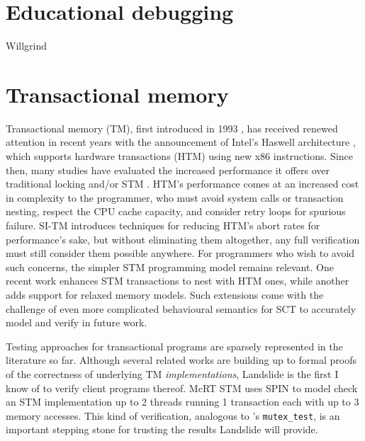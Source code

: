 \section{Educational debugging}

Willgrind \cite{willgrind}

\section{Transactional memory}

Transactional memory (TM), first introduced in 1993 \cite{transactional-memory},
has received renewed attention in recent years with the announcement of Intel's Haswell architecture \cite{htm-haswell},
which supports hardware transactions (HTM) using new x86 instructions.
Since then, many studies have evaluated the increased performance it offers over traditional locking and/or STM
\cite{tm-benchmark-cmu}. %
%
HTM's performance comes at an increased cost in complexity to the programmer,
who must avoid system calls or transaction nesting, respect the CPU cache capacity,
and consider retry loops for spurious failure.
SI-TM \cite{si-tm} introduces techniques for reducing HTM's abort rates for performance's sake,
but without eliminating them altogether, any full verification must still consider them possible anywhere.
For programmers who wish to avoid such concerns,
the simpler STM programming model remains relevant.
One recent work \cite{hybrid-htm-stm} enhances STM transactions to nest with HTM ones,
while another \cite{stm-relaxed-memory} adds support for relaxed memory models.
Such extensions come with the challenge of even more complicated behavioural semantics
for SCT to accurately model and verify in future work.

Testing approaches for transactional programs are sparsely represented in the literature so far.
Although several related works \cite{tm-correctness,tm-completeness,specifying-verifying-tm}
are building up to formal proofs of the correctness of underlying TM {\em implementations},
Landslide is the first I know of to verify client programs thereof.
McRT STM \cite{mc-tm-with-spin} uses SPIN \cite{spin} to model check an STM implementation
up to 2 threads running 1 transaction each with up to 3 memory accesses.
This kind of verification,
analogous to \sect{\ref{sec:education-pebbles-tests}}'s {\tt mutex\_test},
is an important stepping stone for trusting the results Landslide will provide.

